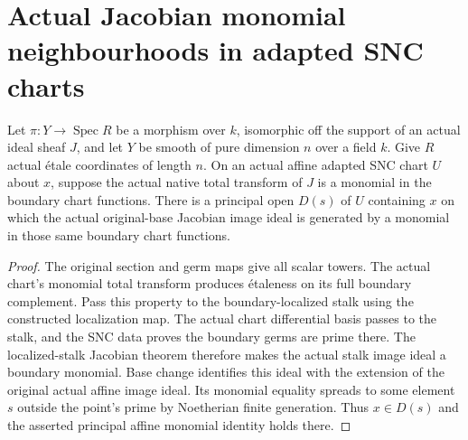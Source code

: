 \section{Actual Jacobian monomial neighbourhoods in adapted SNC charts}

\begin{theorem}\label{thm:sc0-native-snc-jacobian-neighbourhood}
\leanok
{}
Let $\pi:Y\to\operatorname{Spec}R$ be a morphism over $k$, isomorphic off the support of an actual
ideal sheaf $J$, and let $Y$ be smooth of pure dimension $n$ over a field $k$.
Give $R$ actual \'etale coordinates of length $n$. On an actual affine adapted
SNC chart $U$ about $x$, suppose the actual native total transform of $J$ is a
monomial in the boundary chart functions. There is a principal open $D(s)$ of
$U$ containing $x$ on which the actual original-base Jacobian image ideal is
generated by a monomial in those same boundary chart functions.
\end{theorem}
\begin{proof}
The original section and germ maps give all scalar towers. The actual chart's
monomial total transform produces \'etaleness on its full boundary complement.
Pass this property to the boundary-localized stalk using the constructed
localization map. The actual chart differential basis passes to the stalk, and
the SNC data proves the boundary germs are prime there. The localized-stalk
Jacobian theorem therefore makes the actual stalk image ideal a boundary
monomial. Base change identifies this ideal with the extension of the original
actual affine image ideal. Its monomial equality spreads to some element $s$
outside the point's prime by Noetherian finite generation. Thus $x\in D(s)$ and
the asserted principal affine monomial identity holds there.
\end{proof}

